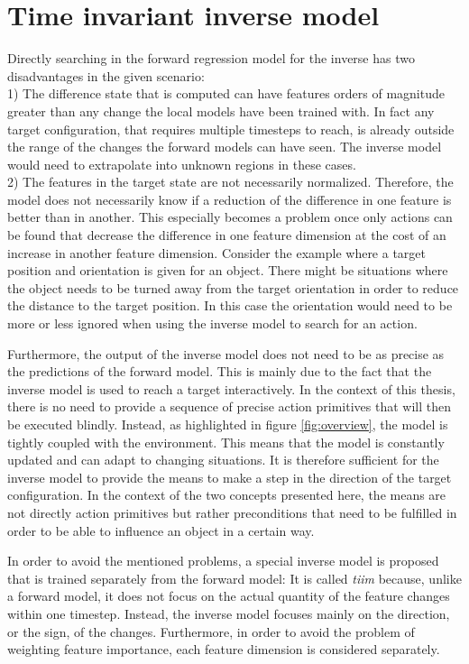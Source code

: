 \section{Time invariant inverse model \label{sec:invModel}}
Directly searching in the forward regression model for the inverse has two disadvantages in the given scenario: \\
1) The difference state that is computed can have features orders of magnitude greater than any change the local models have been trained with. In fact any target configuration, that requires multiple timesteps to reach, is already outside the range of the changes the forward models can have seen. 
The inverse model would need to extrapolate into unknown regions in these cases. \\
2) The features in the target state are not necessarily normalized. Therefore, the model does not necessarily know if a reduction of the difference in one feature is better than in another. This especially becomes a problem once only actions can be found that decrease the difference in one feature dimension at the cost of an increase in another feature dimension. Consider the example where a target position and orientation is given for an object. There might be situations where the object needs to be turned away from the target orientation in order to reduce the distance to the target position. In this case the orientation would need to be more or less ignored when using the inverse model to search for an action.

Furthermore, the output of the inverse model does not need to be as precise as the predictions of the forward model. This is mainly due to the fact that the inverse model is used to reach a target interactively. In the context of this thesis, there is no need to provide a sequence of precise action primitives that will then be executed blindly. Instead, as highlighted in figure \ref{fig:overview}, the model is tightly coupled with the environment. This means that the model is constantly updated and can adapt to changing situations. It is therefore sufficient for the inverse model to provide the means to make a step in the direction of the target configuration. In the context of the two concepts presented here, the means are not directly action primitives but rather preconditions that need to be fulfilled in order to be able to influence an object in a certain way.

In order to avoid the mentioned problems, a special inverse model is proposed that is trained separately from the forward model:
It is called \textit{\gls{tiim}} because, unlike a forward model, it does not focus on the actual quantity of the feature changes within one timestep. Instead, the inverse model focuses mainly on the direction, or the sign, of the changes. Furthermore, in order to avoid the problem of weighting feature importance, each feature dimension is considered separately. 

